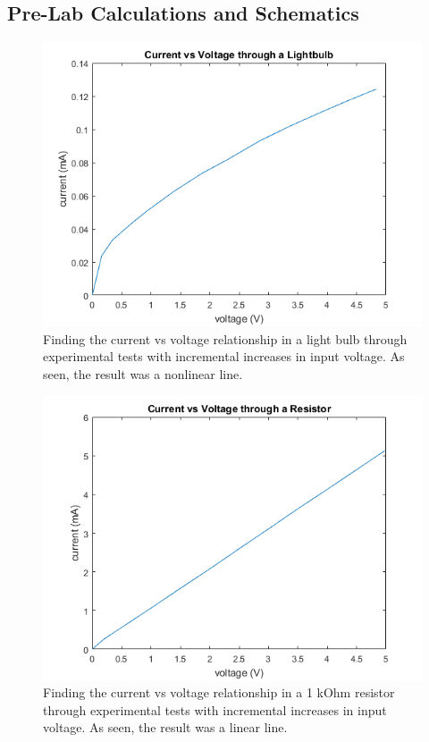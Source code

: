 \documentclass[10pt]{article}
\begin{document}
	\subsection{Pre-Lab Calculations and Schematics}
	
	\begin{center}
		\begin{figure}[H]
			\centering
			\includegraphics[scale = 0.8]{supplemental/lightbulbgraph.png}
			\caption{Finding the current vs voltage relationship in a light bulb through experimental tests with incremental increases in input voltage. As seen, the result was a nonlinear line.}
		\end{figure}

		\begin{figure}[H]
		\centering
		\includegraphics[scale = 0.8]{supplemental/resistorgraph.png}
		\caption{Finding the current vs voltage relationship in a 1 kOhm resistor through experimental tests with incremental increases in input voltage. As seen, the result was a linear line.}
		\end{figure}
		

\end{center}
\end{document}
